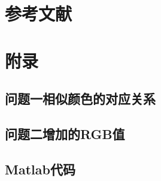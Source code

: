 \documentclass{article}
\begin{document}
    
 \section{参考文献}
	
	
    
    
 \section{附录}   
 \subsection{问题一相似颜色的对应关系}
 
 
 \subsection{问题二增加的RGB值}
 
 
\subsection{Matlab代码}

\end{document}
